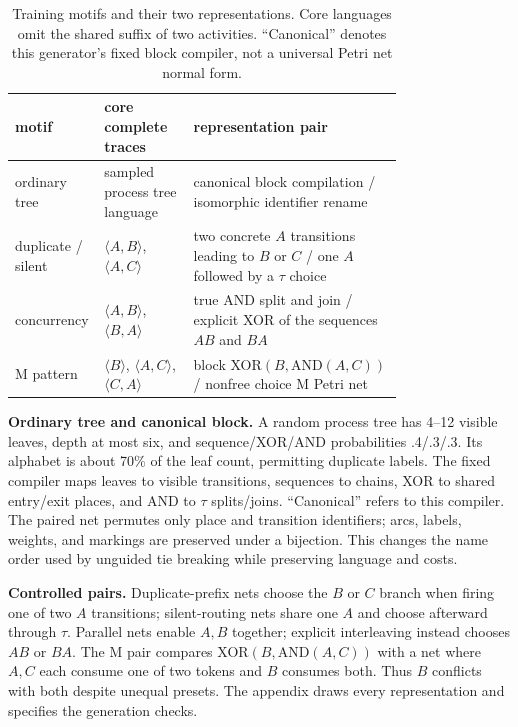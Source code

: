 \documentclass[manuscript,screen,nonacm]{acmart}
\begin{document}
\begin{table}[H]
\centering
\caption{Training motifs and their two representations. Core languages omit the shared suffix of two activities. ``Canonical'' denotes this generator's fixed block compiler, not a universal Petri net normal form.}
\label{tab:motifs}
\footnotesize
\setlength{\tabcolsep}{3.5pt}
\begin{tabular}{@{}lp{0.23\linewidth}p{0.54\linewidth}@{}}
\toprule
motif & core complete traces & representation pair \\
\midrule
ordinary tree & sampled process tree language & canonical block compilation / isomorphic identifier rename \\
duplicate / silent & $\langle A,B\rangle$, $\langle A,C\rangle$ & two concrete $A$ transitions leading to $B$ or $C$ / one $A$ followed by a $\tau$ choice \\
concurrency & $\langle A,B\rangle$, $\langle B,A\rangle$ & true AND split and join / explicit XOR of the sequences $AB$ and $BA$ \\
M pattern & $\langle B\rangle$, $\langle A,C\rangle$, $\langle C,A\rangle$ & block XOR$(B,\mathrm{AND}(A,C))$ / nonfree choice M Petri net \\
\bottomrule
\end{tabular}
\end{table}

\textbf{Ordinary tree and canonical block.} A random process tree has 4--12 visible leaves, depth at most six, and sequence/XOR/AND probabilities .4/.3/.3. Its alphabet is about 70\% of the leaf count, permitting duplicate labels. The fixed compiler maps leaves to visible transitions, sequences to chains, XOR to shared entry/exit places, and AND to $\tau$ splits/joins. ``Canonical'' refers to this compiler. The paired net permutes only place and transition identifiers; arcs, labels, weights, and markings are preserved under a bijection. This changes the name order used by unguided tie breaking while preserving language and costs.

\textbf{Controlled pairs.} Duplicate-prefix nets choose the $B$ or $C$ branch when firing one of two $A$ transitions; silent-routing nets share one $A$ and choose afterward through $\tau$. Parallel nets enable $A,B$ together; explicit interleaving instead chooses $AB$ or $BA$. The M pair compares XOR$(B,\mathrm{AND}(A,C))$ with a net where $A,C$ each consume one of two tokens and $B$ consumes both. Thus $B$ conflicts with both despite unequal presets. The appendix draws every representation and specifies the generation checks.
\end{document}
